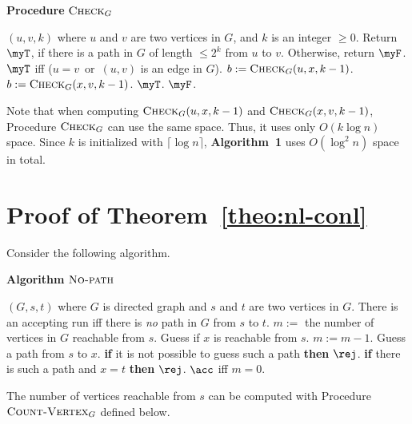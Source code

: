 \documentclass[11pt, a4paper]{article}
\begin{document}
{{\begin{algorithm}[h]
\label{proc:check}
\caption{{\bf Procedure} $\textsc{Check}_G$}
\begin{algorithmic}[1]
\REQUIRE
$(u,v,k)$ where $u$ and $v$ are two vertices in $G$, and $k$ is an integer $\geq 0$.
\ENSURE
Return $\myT$, if there is a path in $G$ of length $\leq 2^k$ from $u$ to $v$. Otherwise, return $\myF$.
\RETURN $\myT$ iff ($u=v$\ or\ $(u,v)$ is an edge in $G$). 
\ENDIF
{}
\STATE
$b:= \textsc{Check}_G(u,x,k-1)$.
\STATE
$b := \textsc{Check}_G(x,v,k-1)$.
\RETURN $\myT$.
\ENDIF
\ENDIF
\ENDFOR
\RETURN $\myF$.
\end{algorithmic}
\end{algorithm}

Note that when computing $\textsc{Check}_G(u,x,k-1)$ and $\textsc{Check}_G(x,v,k-1)$,
Procedure $\textsc{Check}_G$ can use the same space.
Thus, it uses only $O(k\log n)$ space.
Since $k$ is initialized with $\lceil \log n \rceil$,
{\bf Algorithm~1} uses $O(\log^2 n)$ space in total.


\section{Proof of Theorem~\ref{theo:nl-conl}}
\label{app:nl-conl}

Consider the following algorithm.
\begin{algorithm}[h]
\label{alg:no-path}
\caption{{\bf Algorithm} $\textsc{No-path}$}
\begin{algorithmic}[1]
\REQUIRE
$(G,s,t)$ where $G$ is directed graph and $s$ and $t$ are two vertices in $G$.
\ENSURE
There is an accepting run iff there is {\em no} path in $G$ from $s$ to $t$.
\STATE
$m:=$ the number of vertices in $G$ reachable from $s$.
\STATE
{}
\STATE
Guess if $x$ is reachable from $s$.
\STATE
$m:=m-1$.
\STATE
Guess a path from $s$ to $x$.
\STATE
{\bf if} it is not possible to guess such a path {\bf then} $\rej$.
\STATE
{\bf if} there is such a path and $x=t$ {\bf then} $\rej$.
\ENDIF
\ENDFOR
\STATE
$\acc$ iff $m=0$.
\end{algorithmic}
\end{algorithm}

The number of vertices reachable from $s$ can be computed with Procedure $\textsc{Count-Vertex}_G$ 
defined below.

}}
\end{document}
